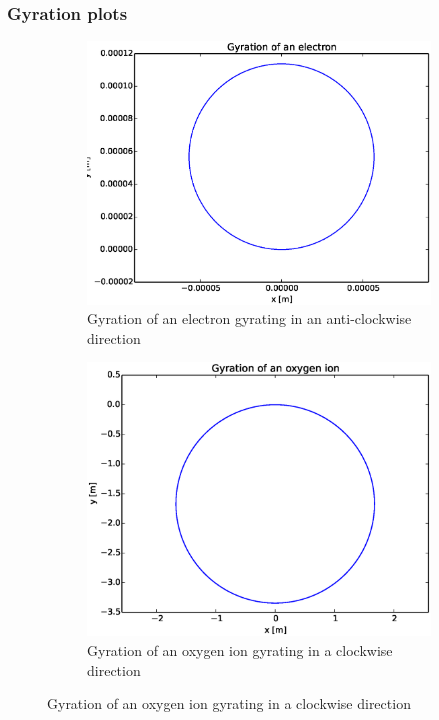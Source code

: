 \documentclass[x11names]{article}
\begin{document}
      \subsubsection{Gyration plots}
            \begin{figure}
                  \begin{subfigure}[b]{0.45\textwidth}
                        \includegraphics[width = \textwidth]{../source/electronGyration}
                        \caption{Gyration of an electron gyrating in an anti-clockwise direction}
                  \end{subfigure}
                  \begin{subfigure}[b]{0.45\textwidth}
                        \includegraphics[width = \linewidth]{../source/ionGyration}
                        \caption{Gyration of an oxygen ion gyrating in a clockwise direction}
                  \end{subfigure}
            \end{figure}
\end{document}

